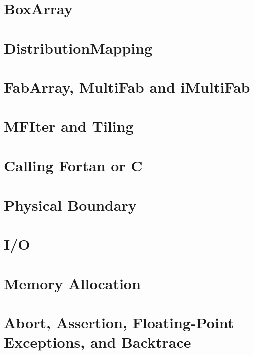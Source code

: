 





\section{BoxArray}

\section{DistributionMapping}

\section{FabArray, MultiFab and iMultiFab}
\label{sec:basics:multifab}


\section{MFIter and Tiling}

\section{Calling Fortan or C}

\section{Physical Boundary}

\section{I/O}

\section{Memory Allocation}

\section{Abort, Assertion, Floating-Point Exceptions, and Backtrace}
